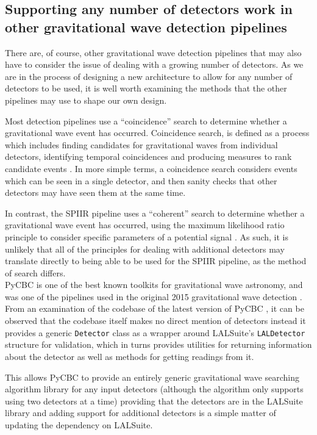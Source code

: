 \documentclass{article}
\begin{document}
\subsection{Supporting any number of detectors work in other gravitational wave detection pipelines} \label{sec:lit_review:pipelines}

There are, of course, other gravitational wave detection pipelines that may also have to consider the issue of dealing with a growing number of detectors.
As we are in the process of designing a new architecture to allow for any number of detectors to be used, it is well worth examining the methods that the other pipelines may use to shape our own design.

Most detection pipelines use a ``coincidence'' search to determine whether a gravitational wave event has occurred.
Coincidence search, is defined as a process which includes finding candidates for gravitational waves from individual detectors, identifying temporal coincidences and producing measures to rank candidate events \cite[chapter 3]{ChuThesis}.
In more simple terms, a coincidence search considers events which can be seen in a single detector, and then sanity checks that other detectors may have seen them at the same time.

In contrast, the SPIIR pipeline uses a ``coherent'' search to determine whether a gravitational wave event has occurred, using the maximum likelihood ratio principle to consider specific parameters of a potential signal \cite[chapter 4]{ChuThesis}.
As such, it is unlikely that all of the principles for dealing with additional detectors may translate directly to being able to be used for the SPIIR pipeline, as the method of search differs.
\\

PyCBC is one of the best known toolkits for gravitational wave astronomy, and was one of the pipelines used in the original 2015 gravitational wave detection \cite{pycbc_home}.
From an examination of the codebase of the latest version of PyCBC \cite[October 2020]{pycbc}, it can be observed that the codebase itself makes no direct mention of detectors \textemdash{} instead it provides a generic \texttt{Detector} class as a wrapper around LALSuite's \cite{lalsuite} \texttt{LALDetector} structure for validation, which in turns provides utilities for returning information about the detector as well as methods for getting readings from it.

This allows PyCBC to provide an entirely generic gravitational wave searching algorithm library for any input detectors (although the algorithm only supports using two detectors at a time) providing that the detectors are in the LALSuite library \textemdash{} and adding support for additional detectors is a simple matter of updating the dependency on LALSuite.
\end{document}
